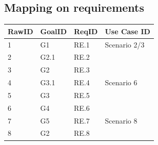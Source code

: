 \subsection{Mapping on requirements}
\begin{center}
	\begin{tabular}{ | l | p{2cm} | p{2cm}| p{2cm}|} 
		\hline
		 RawID & GoalID & ReqID & Use Case ID \\
		\hline
		1&G1&RE.1&Scenario 2/3\\
		\hline
		2&G2.1&RE.2&\\
		\hline
		3&G2&RE.3&\\
		\hline
		4&G3.1&RE.4&Scenario 6\\
		\hline
		5&G3&RE.5&\\
		\hline
		6&G4&RE.6&\\
		\hline
		7&G5&RE.7&Scenario 8\\
		\hline
		8&G2&RE.8&\\
		\hline
	\end{tabular}
\end{center}


 